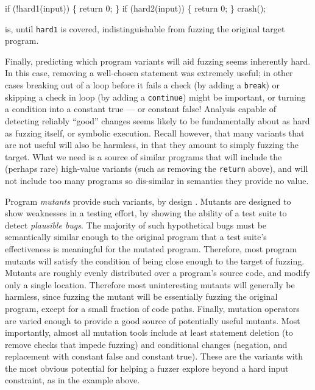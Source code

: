 \begin{code}
  if (!hard1(input)) \{
      return 0;
  \}
  if (hard2(input)) \{
      return 0;
  \}
  crash();
\end{code}

\noindent is, until {\tt hard1} is covered, indistinguishable from fuzzing the original target program.

Finally, predicting which program variants will aid fuzzing seems
inherently hard.  In this case, removing a well-chosen statement was
extremely useful; in other cases breaking out of a loop before it
fails a check (by adding  a {\tt break}) or skipping a check in loop
(by adding a {\tt continue}) might be important, or turning a condition into a constant true --- or constant false!  Analysis capable of detecting reliably ``good'' changes seems likely to be fundamentally about as hard as fuzzing itself, or symbolic execution.  Recall however, that many variants that are not useful will also be harmless, in that they amount to simply fuzzing the target.  What we need is a source of similar programs that will include the (perhaps rare) high-value variants (such as removing the {\tt return} above), and will not include too many programs so dis-similar in semantics they provide no value.

Program \emph{mutants} provide such variants, by design \cite{MutationSurvey}.  Mutants are designed to show weaknesses in a testing effort, by showing
the ability of a test suite to detect \emph{plausible bugs}.  The majority of such hypothetical bugs must be semantically similar enough to
the original program that a test suite's effectiveness is meaningful for the mutated program.  Therefore, most program mutants
will satisfy the condition of being close enough to the target of fuzzing.  Mutants are roughly evenly distributed over a program's source code,
and modify only a single location.  Therefore most uninteresting mutants will generally be harmless, since fuzzing the mutant will be essentially
fuzzing the original program, except for a small fraction of code paths.  Finally, mutation operators are varied enough to provide a good source
of potentially useful mutants.  Most importantly, almost all mutation tools include at least statement deletion (to remove checks that impede
fuzzing) and conditional changes (negation, and replacement with constant false and constant true).  These are the variants with the most
obvious potential for helping a fuzzer explore beyond a hard input constraint, as in the example above.

